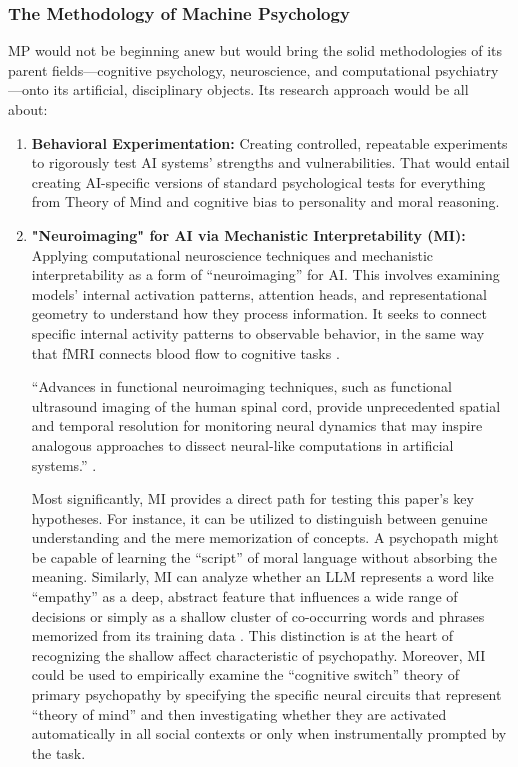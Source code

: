 \documentclass{article}
\begin{document}
\subsubsection{The Methodology of Machine Psychology}
MP would not be beginning anew but would bring the solid methodologies of its parent fields—cognitive psychology, neuroscience, and computational psychiatry—onto its artificial, disciplinary objects. Its research approach would be all about:
\begin{enumerate}
    \item \textbf{Behavioral Experimentation:} Creating controlled, repeatable experiments to rigorously test AI systems' strengths and vulnerabilities. That would entail creating AI-specific versions of standard psychological tests for everything from Theory of Mind and cognitive bias to personality and moral reasoning.
    \item \textbf{"Neuroimaging" for AI via Mechanistic Interpretability (MI):} Applying computational neuroscience techniques and mechanistic interpretability as a form of “neuroimaging” for AI. This involves examining models' internal activation patterns, attention heads, and representational geometry to understand how they process information. It seeks to connect specific internal activity patterns to observable behavior, in the same way that fMRI connects blood flow to cognitive tasks \citep{ref2}.
    
    “Advances in functional neuroimaging techniques, such as functional ultrasound imaging of the human spinal cord, provide unprecedented spatial and temporal resolution for monitoring neural dynamics that may inspire analogous approaches to dissect neural-like computations in artificial systems.” \citep{ref35}.
    
    Most significantly, MI provides a direct path for testing this paper's key hypotheses. For instance, it can be utilized to distinguish between genuine understanding and the mere memorization of concepts. A psychopath might be capable of learning the “script” of moral language without absorbing the meaning. Similarly, MI can analyze whether an LLM represents a word like “empathy” as a deep, abstract feature that influences a wide range of decisions or simply as a shallow cluster of co-occurring words and phrases memorized from its training data \citep{ref28, ref34}. This distinction is at the heart of recognizing the shallow affect characteristic of psychopathy. Moreover, MI could be used to empirically examine the “cognitive switch” theory of primary psychopathy by specifying the specific neural circuits that represent “theory of mind” and then investigating whether they are activated automatically in all social contexts or only when instrumentally prompted by the task.
    

\end{enumerate}
\end{document}
